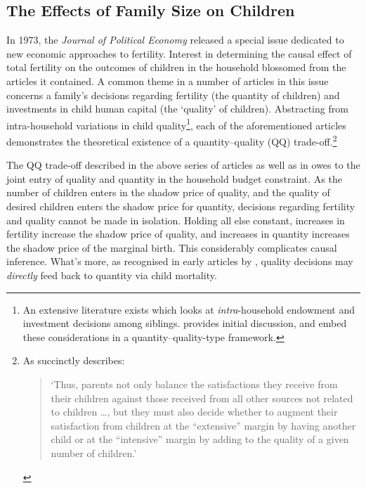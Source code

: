 \documentclass{article}
\begin{document}
\begin{spacing}{1.4}
\section{The Effects of Family Size on Children}
\label{Fscn:kids}
In 1973, the \emph{Journal of Political Economy} released a special issue 
dedicated to new economic approaches to fertility.  Interest in determining
the causal effect of total fertility on the outcomes of children in the 
household blossomed from the articles it contained.  A common theme in a number 
of articles in this issue \citep{BeckerLewis1973, DeTray1973, Willis1973} 
concerns a family's decisions regarding fertility (the quantity of children) 
and investments in child human capital (the `quality' of children). Abstracting 
from intra-household variations in child quality\footnote{An extensive 
literature exists which looks at \emph{intra}-household endowment and investment
decisions among siblings.  \citet{Behrmanetal1982} provides initial discussion,
and \citet{AizerCunha2012} embed these considerations in a quantity--quality-type 
framework.}, each of the aforementioned articles demonstrates the theoretical 
existence of a quantity--quality (QQ) trade-off.\footnote{As \citet{Willis1973} 
succinctly describes:
\begin{quote}
`Thus, parents not only balance the satisfactions they receive from their
children against those received from all other sources not related to 
children \ldots, but they must also decide whether to augment their 
satisfaction from children at the ``extensive'' margin by having another
child or at the ``intensive'' margin by adding to the quality of a given
number of children.'
\end{quote}
}

The QQ trade-off described in the above series of articles as well as in
\citet{BeckerTomes1976,BeckerTomes1986} owes to the joint entry of quality and 
quantity in the household budget constraint.  As the number of children 
enters in the shadow price of quality, and the quality of desired children 
enters the shadow price for quantity, decisions regarding fertility and quality 
cannot be made in isolation.  Holding all else constant, increases in fertility 
increase the shadow price of quality, and increases in quantity increases the
shadow price of the marginal birth. This considerably complicates causal 
inference. What's more, as recognised in early articles by \citet{%
BenPorathWelch1972,BenPorath1976}, quality decisions may \emph{directly} feed
back to quantity via child mortality.


\end{spacing}
\end{document}
